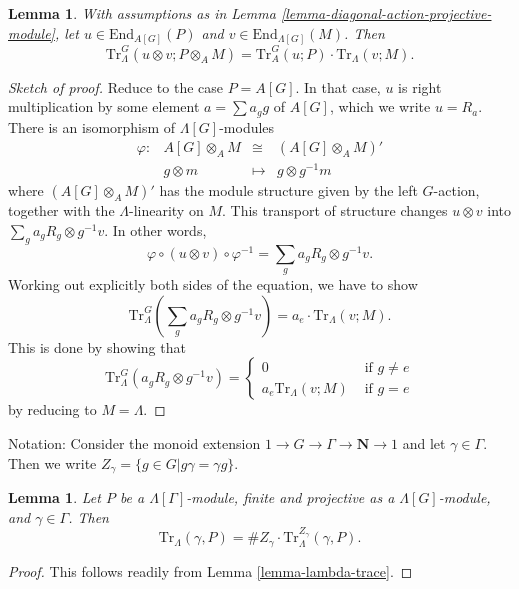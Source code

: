 \documentclass{stacks-project}
\theoremstyle{plain}
\newtheorem{lemma}[subsection]{Lemma}
\theoremstyle{definition}
\theoremstyle{remark}
\numberwithin{equation}{subsection}
\begin{document}
\begin{lemma}
\label{lemma-multiplicative-trace}
With assumptions as in
Lemma \ref{lemma-diagonal-action-projective-module},
let
$u\in \text{End}_{A[G]}(P)$ and $v\in \text{End}_{\Lambda[G]}(M)$. Then
$$
\text{Tr}_\Lambda^G \left(u \otimes v; P \otimes_A M\right) = \text{Tr}_A^G(u;
P)\cdot \text{Tr}_\Lambda(v;M).
$$
\end{lemma}

\begin{proof}[Sketch of proof]
Reduce to the case $P=A[G]$. In that case, $u$ is right multiplication by some
element $a = \sum a_gg$ of $A[G]$, which we write $u = R_a$. There is an
isomorphism of $\Lambda[G]$-modules
$$
\begin{matrix}
\varphi : & A[G]\otimes_A M & \cong & \left(A[G]\otimes_A M\right)'\\
& g \otimes m & \longmapsto & g \otimes g^{-1}m
\end{matrix}
$$
where $\left(A[G]\otimes_A M\right)'$ has the module structure given by the
left $G$-action, together with the $\Lambda$-linearity on $M$. This transport
of structure changes $u \otimes v$ into $\sum_ga_gR_g \otimes g^{-1}v$. In other
words,
$$
\varphi \circ (u \otimes v) \circ \varphi^{-1}
=
\sum_ga_gR_g \otimes g^{-1}v.
$$
Working out explicitly both sides of the equation, we have to show
$$
\text{Tr}_\Lambda^G\left(\sum_g a_gR_g \otimes g^{-1}v\right) = a_e\cdot
\text{Tr}_\Lambda(v; M).
$$
This is done by showing that
$$
\text{Tr}_\Lambda^G\left(a_gR_g \otimes g^{-1}v\right) =
\left\{
\begin{matrix}
0 & \text{ if } g\neq e\\
a_e\text{Tr}_\Lambda\left(v; M\right) & \text{ if }g = e
\end{matrix}
\right.
$$
by reducing to $M=\Lambda$.
\end{proof}

\noindent
Notation:
Consider the monoid extension $1 \to G\to \Gamma\to \mathbf{N} \to 1$ and let
$\gamma\in \Gamma$.
Then we write $Z_\gamma = \{g\in G | g\gamma = \gamma g\}$.

\begin{lemma}
\label{lemma-gamma-z-gamma-trace}
Let $P$ be a $\Lambda[\Gamma]$-module, finite and projective as a
$\Lambda[G]$-module, and $\gamma \in \Gamma$. Then
$$
\text{Tr}_{\Lambda}(\gamma, P) =
\# Z_\gamma \cdot \text{Tr}_\Lambda^{Z_\gamma}\left(\gamma, P\right).
$$
\end{lemma}

\begin{proof}
This follows readily from Lemma \ref{lemma-lambda-trace}.
\end{proof}
\end{document}
